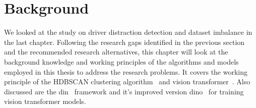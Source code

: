 


\chapter{Background}
\label{chapter:background}
We looked at the study on driver distraction detection and dataset imbalance in the last chapter. Following the research gaps identified in the previous section and the recommended research alternatives, this chapter will look at the background knowledge and working principles of the algorithms and models employed in this thesis to address the research problems. It covers the working principle of the HDBSCAN clustering algorithm~\citep{HDBSCAN_algo_campello2013density} and vision transformer~\cite{Vit_Paper_Dosovitskiy2020AnII}. Also discussed are the \gls{din}~\citep{dino_caron2021emerging} framework and it's improved version \gls{dino}~\citep{dinov2_oquab2023dinov2} for training vision transformer models.

